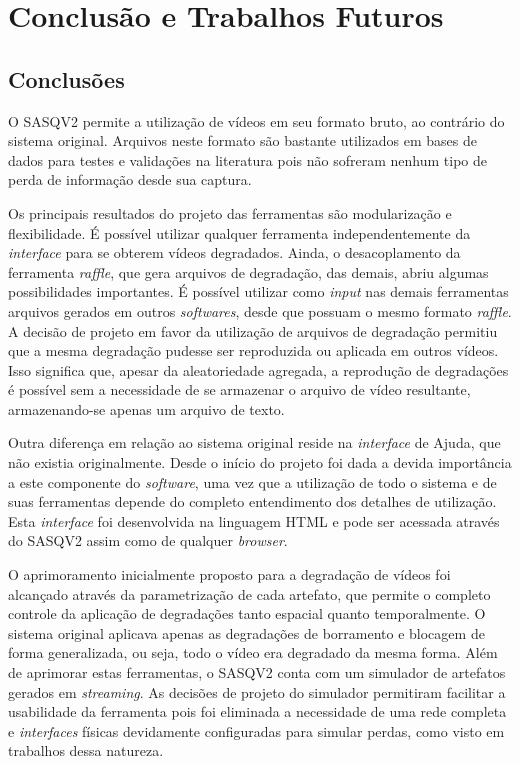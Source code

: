 
\chapter{Conclusão e Trabalhos Futuros}




\section{Conclusões}

O SASQV2 permite a utilização de vídeos em seu formato bruto, ao contrário do sistema original. Arquivos neste formato são bastante utilizados em bases de dados para testes e validações na literatura pois não sofreram nenhum tipo de perda de informação desde sua captura.

Os  principais resultados do projeto das ferramentas são modularização e flexibilidade. É possível utilizar qualquer ferramenta independentemente da \emph{interface} para se obterem vídeos degradados. Ainda, o desacoplamento da ferramenta \emph{raffle}, que gera arquivos de degradação, das demais, abriu algumas possibilidades importantes. É possível utilizar como \emph{input} nas demais ferramentas arquivos gerados em outros \emph{softwares}, desde que possuam o mesmo formato \emph{raffle}. A decisão de projeto em favor da utilização de arquivos de degradação permitiu que a mesma degradação pudesse ser reproduzida ou aplicada em outros vídeos. Isso significa que, apesar da aleatoriedade agregada, a reprodução de degradações é possível sem a necessidade de se armazenar o arquivo de vídeo resultante, armazenando-se apenas um arquivo de texto. 

Outra diferença em relação ao sistema original reside na \emph{interface} de Ajuda, que não existia originalmente. Desde o início do projeto foi dada a devida importância a este componente do \emph{software}, uma vez que a utilização de todo o sistema e de suas ferramentas depende do completo entendimento dos detalhes de utilização. Esta \emph{interface} foi desenvolvida na linguagem HTML e pode ser acessada através do SASQV2 assim como de qualquer \emph{browser}.

O aprimoramento inicialmente proposto para a degradação de vídeos foi alcançado através da parametrização de cada artefato, que permite o completo controle da aplicação de degradações tanto espacial quanto temporalmente. O sistema original aplicava apenas as degradações de borramento e blocagem de forma generalizada, ou seja, todo o vídeo era degradado da mesma forma. Além de aprimorar estas ferramentas, o SASQV2 conta com um simulador de artefatos gerados em \emph{streaming}. As decisões de projeto do simulador permitiram facilitar a usabilidade da ferramenta pois foi eliminada a necessidade de uma rede completa e \emph{interfaces} físicas devidamente configuradas para simular perdas, como visto em trabalhos dessa natureza.

